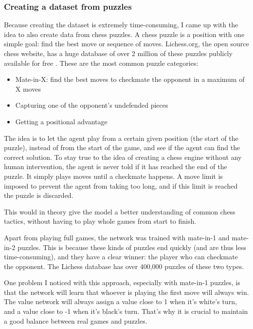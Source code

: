 \documentclass{article}
\begin{document}
\subsubsection{Creating a dataset from puzzles}

Because creating the dataset is extremely time-consuming, I came up with the idea to also
create data from chess puzzles. A chess puzzle is a position with one simple goal: find the best move or sequence of moves.
Lichess.org, the open source chess website, has a huge database of over 2 million of these puzzles publicly available for free \cite{LichessOrgOpen}. 
These are the most common puzzle categories:

\begin{itemize}
    \item Mate-in-X: find the best moves to checkmate the opponent in a maximum of X moves
    \item Capturing one of the opponent's undefended pieces
    \item Getting a positional advantage
\end{itemize}

The idea is to let the agent play from a certain given position (the start of the puzzle), 
instead of from the start of the game, and see if the agent can find the correct solution.
To stay true to the idea of creating a chess engine without any human intervention,
the agent is never told if it has reached the end of the puzzle. It simply plays moves
until a checkmate happens. A move limit is imposed to prevent the agent from taking too long, 
and if this limit is reached the puzzle is discarded. 

This would in theory give the model a better understanding of common chess tactics, without having to play
whole games from start to finish. 

Apart from playing full games, the network was trained with mate-in-1 and mate-in-2 puzzles. 
This is because these kinds of puzzles end quickly (and are thus less time-consuming), 
and they have a clear winner: the player who can checkmate the opponent.
The Lichess database has over 400,000 puzzles of these two types. 

One problem I noticed with this approach, especially with mate-in-1 puzzles, is that 
the network will learn that whoever is playing the first move will always win. 
The value network will always assign a value close to 1 when it's white's turn, 
and a value close to -1 when it's black's turn.
That's why it is crucial to maintain a good balance between real games and puzzles.
\end{document}
